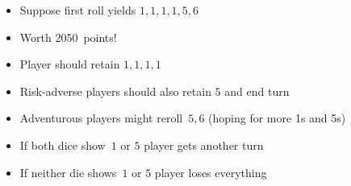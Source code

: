 \documentclass[handout]{beamer}
\theoremstyle{definition}
\begin{document}
\begin{frame}
\begin{example}
\begin{itemize}
\item Suppose first roll yields $1,1,1,1,5,6$
\item Worth 2050~points!
\item Player should retain $1,1,1,1$
\item Risk-adverse players should also retain $5$ and end turn
\item Adventurous players might reroll~$5,6$ (hoping
for more 1s and 5s)
\item If both dice show~$1$ or $5$ player gets another
turn
\item If neither die shows~$1$ or $5$ player loses everything
\end{itemize}
\end{example}

\end{frame}
\end{document}
